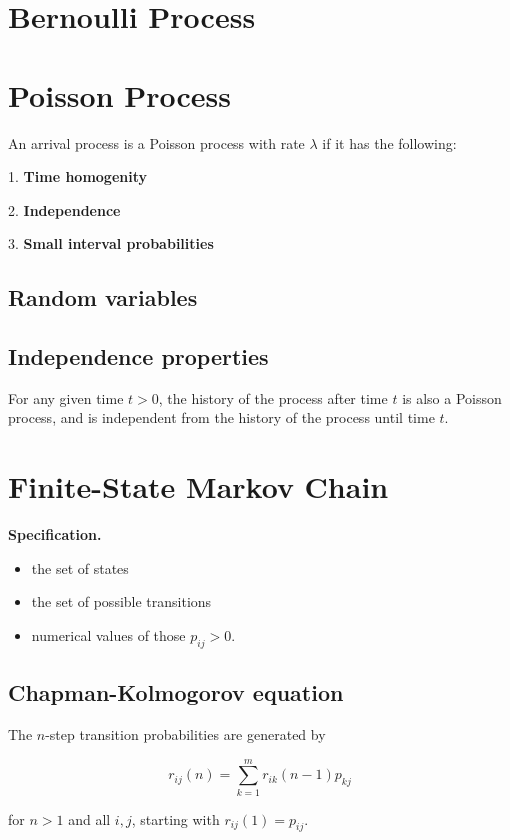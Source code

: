 \section{Bernoulli Process}
\section{Poisson Process}
An arrival process is a Poisson process with rate $\lambda$ if it has the following:

1. \textbf{Time homogenity}

2. \textbf{Independence}

3. \textbf{Small interval probabilities}

\subsection*{Random variables}

\subsection*{Independence properties}
For any given time $t > 0$, the history of the process after time $t$ is also a Poisson process, and is independent
from the history of the process until time $t$.

\section{Finite-State Markov Chain}
\textbf{Specification.}
\begin{itemize}
    \item the set of states
    \item the set of possible transitions
    \item numerical values of those $p_{ij} > 0$.
\end{itemize}

\subsection*{Chapman-Kolmogorov equation}
The $n$-step transition probabilities are generated by

$$r_{ij}(n) = \sum_{k=1}^{m}r_{ik} (n - 1) p_{kj}$$

for $n > 1$ and all $i, j$, starting with $r_{ij}(1) = p_{ij}$.
